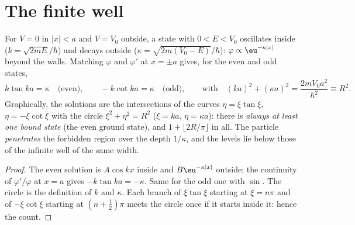 \section{The finite well}

\begin{proposition}\label{prop:b2:potential-wells-tunneling:finite}
For $V = 0$ in $|x| < a$ and $V = V_0$ outside, a state with $0 < E < V_0$
oscillates inside ($k = \sqrt{2mE}/\hbar$) and decays outside ($\kappa =
\sqrt{2m(V_0 - E)}/\hbar$): $\varphi \propto \eu^{-\kappa|x|}$ beyond the walls.
Matching $\varphi$ and $\varphi'$ at $x = \pm a$ gives, for the even and odd
states,
\[
k\tan ka = \kappa \quad\text{(even)}, \qquad
-k\cot ka = \kappa \quad\text{(odd)}, \qquad\text{with}\quad
(ka)^2 + (\kappa a)^2 = \frac{2mV_0a^2}{\hbar^2} \equiv R^2 .
\]
Graphically, the solutions are the intersections of the curves $\eta =
\xi\tan\xi$, $\eta = -\xi\cot\xi$ with the circle $\xi^2 + \eta^2 = R^2$
($\xi = ka$, $\eta = \kappa a$): there is \emph{always at least one bound
state} (the even ground state), and $1 + \lfloor 2R/\pi\rfloor$ in all.
The particle \emph{penetrates} the forbidden region over the depth
$1/\kappa$, and the levels lie below those of the infinite well of the
same width.
\end{proposition}

\begin{proof}
The even solution is $A\cos kx$ inside and $B\eu^{-\kappa|x|}$ outside; the
continuity of $\varphi'/\varphi$ at $x = a$ gives $-k\tan ka = -\kappa$. Same
for the odd one with $\sin$. The circle is the definition of $k$ and
$\kappa$. Each branch of $\xi\tan\xi$ starting at $\xi = n\pi$ and of
$-\xi\cot\xi$ starting at $(n + \tfrac12)\pi$ meets the circle once if it
starts inside it: hence the count.
\end{proof}

